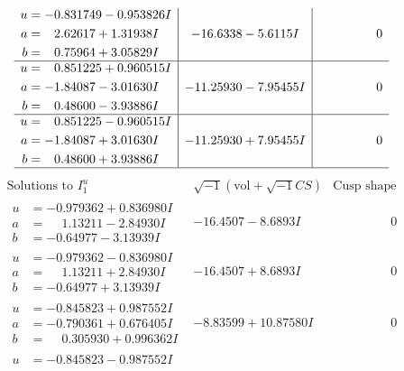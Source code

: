 \documentclass[1p]{elsarticle_modified}
\theoremstyle{definition}
\newcommand{\I}{\sqrt{-1}}
\begin{document}
$$\begin{array}{c|c|c}
\begin{aligned}
u &= -0.831749 - 0.953826 I \\
a &= \phantom{-}2.62617 + 1.31938 I \\
b &= \phantom{-}0.75964 + 3.05829 I\end{aligned}
 & -16.6338 - 5.6115 I & \phantom{-0.000000 } 0 \\ \hline\begin{aligned}
u &= \phantom{-}0.851225 + 0.960515 I \\
a &= -1.84087 - 3.01630 I \\
b &= \phantom{-}0.48600 - 3.93886 I\end{aligned}
 & -11.25930 - 7.95455 I & \phantom{-0.000000 } 0 \\ \hline\begin{aligned}
u &= \phantom{-}0.851225 - 0.960515 I \\
a &= -1.84087 + 3.01630 I \\
b &= \phantom{-}0.48600 + 3.93886 I\end{aligned}
 & -11.25930 + 7.95455 I & \phantom{-0.000000 } 0\\
 \hline 
 \end{array}$$\newpage$$\begin{array}{c|c|c}  
\text{Solutions to }I^u_{1}& \I (\text{vol} + \sqrt{-1}CS) & \text{Cusp shape}\\
 \hline 
\begin{aligned}
u &= -0.979362 + 0.836980 I \\
a &= \phantom{-}1.13211 - 2.84930 I \\
b &= -0.64977 - 3.13939 I\end{aligned}
 & -16.4507 - 8.6893 I & \phantom{-0.000000 } 0 \\ \hline\begin{aligned}
u &= -0.979362 - 0.836980 I \\
a &= \phantom{-}1.13211 + 2.84930 I \\
b &= -0.64977 + 3.13939 I\end{aligned}
 & -16.4507 + 8.6893 I & \phantom{-0.000000 } 0 \\ \hline\begin{aligned}
u &= -0.845823 + 0.987552 I \\
a &= -0.790361 + 0.676405 I \\
b &= \phantom{-}0.305930 + 0.996362 I\end{aligned}
 & -8.83599 + 10.87580 I & \phantom{-0.000000 } 0 \\ \hline\begin{aligned}
u &= -0.845823 - 0.987552 I \\

\end{aligned}
\end{array}$$
\end{document}
